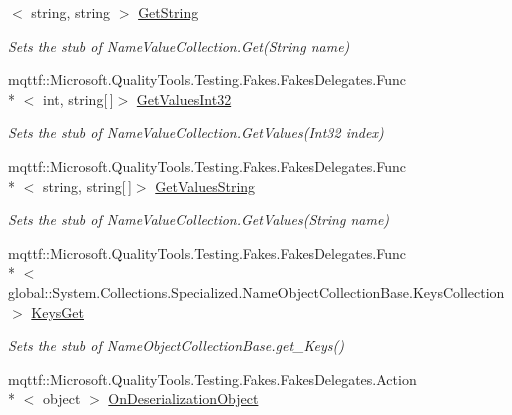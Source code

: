\begin{DoxyCompactItemize}
$<$ string, string $>$ \hyperlink{class_system_1_1_collections_1_1_specialized_1_1_fakes_1_1_stub_name_value_collection_aed7503fcf44c8c1a23a69ad288329049}{Get\-String}
\begin{DoxyCompactList}\small\item\em Sets the stub of Name\-Value\-Collection.\-Get(\-String name)\end{DoxyCompactList}\item 
mqttf\-::\-Microsoft.\-Quality\-Tools.\-Testing.\-Fakes.\-Fakes\-Delegates.\-Func\\*
$<$ int, string\mbox{[}$\,$\mbox{]}$>$ \hyperlink{class_system_1_1_collections_1_1_specialized_1_1_fakes_1_1_stub_name_value_collection_a7e2a7ab6e0300a44fbee27be4b48809b}{Get\-Values\-Int32}
\begin{DoxyCompactList}\small\item\em Sets the stub of Name\-Value\-Collection.\-Get\-Values(\-Int32 index)\end{DoxyCompactList}\item 
mqttf\-::\-Microsoft.\-Quality\-Tools.\-Testing.\-Fakes.\-Fakes\-Delegates.\-Func\\*
$<$ string, string\mbox{[}$\,$\mbox{]}$>$ \hyperlink{class_system_1_1_collections_1_1_specialized_1_1_fakes_1_1_stub_name_value_collection_a8aedfe165a5f73f88f6bbfed70b9081f}{Get\-Values\-String}
\begin{DoxyCompactList}\small\item\em Sets the stub of Name\-Value\-Collection.\-Get\-Values(\-String name)\end{DoxyCompactList}\item 
mqttf\-::\-Microsoft.\-Quality\-Tools.\-Testing.\-Fakes.\-Fakes\-Delegates.\-Func\\*
$<$ global\-::\-System.\-Collections.\-Specialized.\-Name\-Object\-Collection\-Base.\-Keys\-Collection $>$ \hyperlink{class_system_1_1_collections_1_1_specialized_1_1_fakes_1_1_stub_name_value_collection_aa8e8711d1224e548aa96ba1802a69a8b}{Keys\-Get}
\begin{DoxyCompactList}\small\item\em Sets the stub of Name\-Object\-Collection\-Base.\-get\-\_\-\-Keys()\end{DoxyCompactList}\item 
mqttf\-::\-Microsoft.\-Quality\-Tools.\-Testing.\-Fakes.\-Fakes\-Delegates.\-Action\\*
$<$ object $>$ \hyperlink{class_system_1_1_collections_1_1_specialized_1_1_fakes_1_1_stub_name_value_collection_a6132cac1dba372f60e21a03e11aaa6f7}{On\-Deserialization\-Object}

\end{DoxyCompactItemize}
